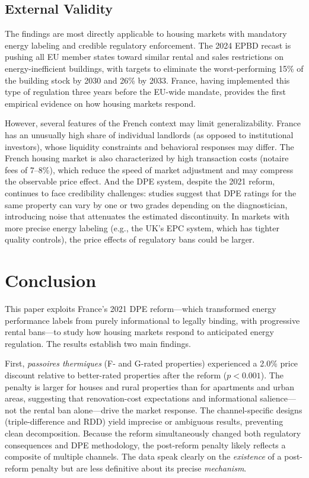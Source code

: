 \documentclass[12pt]{article}
\begin{document}
\subsection{External Validity}

The findings are most directly applicable to housing markets with mandatory energy labeling and credible regulatory enforcement. The 2024 EPBD recast \citep{eurostat2023buildings} is pushing all EU member states toward similar rental and sales restrictions on energy-inefficient buildings, with targets to eliminate the worst-performing 15\% of the building stock by 2030 and 26\% by 2033. France, having implemented this type of regulation three years before the EU-wide mandate, provides the first empirical evidence on how housing markets respond.

However, several features of the French context may limit generalizability. France has an unusually high share of individual landlords (as opposed to institutional investors), whose liquidity constraints and behavioral responses may differ. The French housing market is also characterized by high transaction costs (notaire fees of 7--8\%), which reduce the speed of market adjustment and may compress the observable price effect. And the DPE system, despite the 2021 reform, continues to face credibility challenges: studies suggest that DPE ratings for the same property can vary by one or two grades depending on the diagnostician, introducing noise that attenuates the estimated discontinuity. In markets with more precise energy labeling (e.g., the UK's EPC system, which has tighter quality controls), the price effects of regulatory bans could be larger.


\section{Conclusion}

This paper exploits France's 2021 DPE reform---which transformed energy performance labels from purely informational to legally binding, with progressive rental bans---to study how housing markets respond to anticipated energy regulation. The results establish two main findings.

First, \textit{passoires thermiques} (F- and G-rated properties) experienced a 2.0\% price discount relative to better-rated properties after the reform ($p < 0.001$). The penalty is larger for houses and rural properties than for apartments and urban areas, suggesting that renovation-cost expectations and informational salience---not the rental ban alone---drive the market response. The channel-specific designs (triple-difference and RDD) yield imprecise or ambiguous results, preventing clean decomposition. Because the reform simultaneously changed both regulatory consequences and DPE methodology, the post-reform penalty likely reflects a composite of multiple channels. The data speak clearly on the \textit{existence} of a post-reform penalty but are less definitive about its precise \textit{mechanism}.
\end{document}
